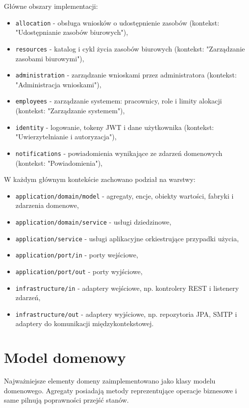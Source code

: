 Główne obszary implementacji:
\begin{itemize}
    \item \texttt{allocation} - obsługa wniosków o udostępnienie zasobów (kontekst: "Udostępnianie zasobów biurowych"),
    \item \texttt{resources} - katalog i cykl życia zasobów biurowych (kontekst: "Zarządzanie zasobami biurowymi"),
    \item \texttt{administration} - zarządzanie wnioskami przez administratora (kontekst: "Administracja wnioskami"),
    \item \texttt{employees} - zarządzanie systemem: pracownicy, role i limity alokacji (kontekst: "Zarządzanie systemem"),
    \item \texttt{identity} - logowanie, tokeny JWT i dane użytkownika (kontekst: "Uwierzytelnianie i autoryzacja"),
    \item \texttt{notifications} - powiadomienia wynikające ze zdarzeń domenowych (kontekst: "Powiadomienia"),
\end{itemize}

W każdym głównym kontekście zachowano podział na warstwy:
\begin{itemize}
    \item \texttt{application/domain/model} - agregaty, encje, obiekty wartości, fabryki i zdarzenia domenowe,
    \item \texttt{application/domain/service} - usługi dziedzinowe,
    \item \texttt{application/service} - usługi aplikacyjne orkiestrujące przypadki użycia,
    \item \texttt{application/port/in} - porty wejściowe,
    \item \texttt{application/port/out} - porty wyjściowe,
    \item \texttt{infrastructure/in} - adaptery wejściowe, np. kontrolery REST i listenery zdarzeń,
    \item \texttt{infrastructure/out} - adaptery wyjściowe, np. repozytoria JPA, SMTP i adaptery do komunikacji międzykontekstowej.
\end{itemize}


\section{Model domenowy}

Najważniejsze elementy domeny zaimplementowano jako klasy modelu domenowego. Agregaty posiadają metody reprezentujące operacje biznesowe i same pilnują poprawności przejść stanów.

